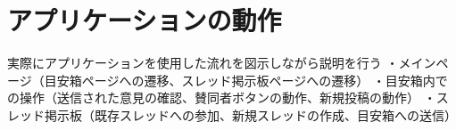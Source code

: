 \documentclass[main]{subfiles}
\begin{document}
\chapter{アプリケーションの動作}
\label{cha:behavior}

実際にアプリケーションを使用した流れを図示しながら説明を行う
・メインページ（目安箱ページへの遷移、スレッド掲示板ページへの遷移）
・目安箱内での操作（送信された意見の確認、賛同者ボタンの動作、新規投稿の動作）
・スレッド掲示板（既存スレッドへの参加、新規スレッドの作成、目安箱への送信）
\end{document}
